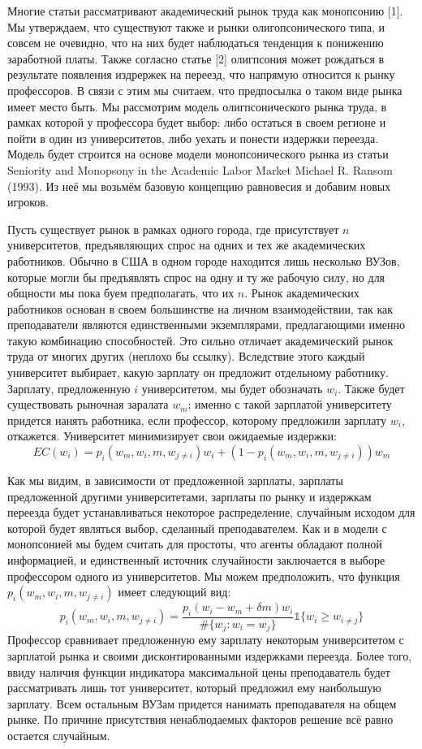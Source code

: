 \documentclass[a4paper, 12pt]{article}
\theoremstyle{definition}
\theoremstyle{plain}
\begin{document}
Многие статьи рассматривают академический рынок труда как монопсонию [1]. Мы утверждаем, что существуют также и рынки олигопсонического типа, и совсем не очевидно, что на них будет наблюдаться тенденция к понижению заработной платы. Также согласно статье [2] олигпсония может рождаться в результате появления издрержек на переезд, что напрямую относится к рынку профессоров. В связи с этим мы считаем, что предпосылка о таком виде рынка имеет место быть.  Мы рассмотрим модель олигпсонического рынка труда, в рамках которой у профессора будет выбор: либо остаться в своем регионе и пойти в один из университетов, либо уехать и понести издержки переезда. Модель будет строится на основе модели монопсонического рынка из статьи Seniority and Monopsony in the Academic Labor Market Michael R. Ransom (1993). Из неё мы возьмём базовую концепцию равновесия и добавим новых игроков. 

Пусть существует рынок в рамках одного города, где присутствует $n$ университетов, предъявляющих спрос на одних и тех же академических работников. Обычно в США в одном городе находится лишь несколько ВУЗов, которые могли бы предъявлять спрос на одну и ту же рабочую силу, но для общности мы пока буем предполагать, что их $n$. Рынок академических работников основан в своем большинстве на личном взаимодействии, так как преподаватели являются единственными экземплярами, предлагающими именно такую комбинацию способностей. Это сильно отличает академический рынок труда от многих других (неплохо бы ссылку). Вследствие этого каждый университет выбирает, какую зарплату он предложит отдельному работнику. Зарплату, предложенную $i$ университетом, мы будет обозначать $w_i$. Также будет существовать рыночная заралата $w_m$; именно с такой зарплатой университету придется нанять работника, если профессор, которому предложили зарплату $w_i$, откажется. Университет минимизирует свои ожидаемые издержки: 
\[
EC(w_i) = p_i(w_m, w_i, m, w_{j \neq i})w_i + (1 - p_i(w_m, w_i, m, w_{j \neq i}))w_m
\]

Как мы видим, в зависимости от предложенной зарплаты, зарплаты предложенной другими университетами, зарплаты по рынку и издержкам переезда будет устанавливаться некоторое распределение, случайным исходом для которой будет являться выбор, сделанный преподавателем. Как и в модели с монопсонией мы будем считать для простоты, что агенты обладают полной информацией, и единственный источник случайности заключается в выборе профессором одного из университетов. Мы можем предположить, что функция $p_i ( w_m, w_i, m, w_{j \neq i}) $ имеет следующий вид: 
\[
p_i( w_m, w_i, m, w_{j \neq i}) = \frac{p_i(w_i - w_m + \delta m) w_i}{\#\{w_j : w_i = w_j\}}\mathds{1} \{ w_i \geq w_ {i \neq j}\}
\]
Профессор сравнивает предложенную ему зарплату некоторым университетом с зарплатой рынка и своими дисконтированными издержками переезда. Более того, ввиду наличия функции индикатора максимальной цены преподаватель будет рассматривать лишь тот университет, который предложил ему наибольшую зарплату. Всем остальным ВУЗам придется нанимать преподавателя на общем рынке. По причине присутствия ненаблюдаемых факторов решение всё равно остается случайным. 
\end{document}
